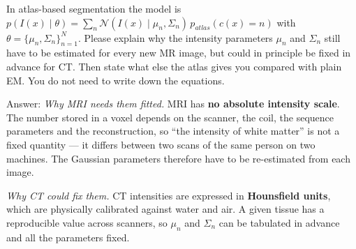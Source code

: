 \documentclass[11pt]{exam}
\newcommand{\answerspace}[1]{\ifprintanswers\else\vspace{#1}\fi}
\begin{document}
\begin{questions}

\question
In atlas-based segmentation the model is $p(I(x) \mid \theta) = \sum_n \mathcal{N}(I(x) \mid \mu_n,
\Sigma_n)\, p_{atlas}(c(x){=}n)$ with $\theta = \{\mu_n, \Sigma_n\}_{n=1}^N$. Please explain why the
intensity parameters $\mu_n$ and $\Sigma_n$ still have to be estimated for every new MR image, but
could in principle be fixed in advance for CT. Then state what else the atlas gives you compared
with plain EM. You do not need to write down the equations.

\begin{solution}
  Answer: \emph{Why MRI needs them fitted.} MRI has \textbf{no absolute intensity scale}. The number
  stored in a voxel depends on the scanner, the coil, the sequence parameters and the
  reconstruction, so ``the intensity of white matter'' is not a fixed quantity --- it differs
  between two scans of the same person on two machines. The Gaussian parameters therefore have to be
  re-estimated from each image.

  \emph{Why CT could fix them.} CT intensities are expressed in \textbf{Hounsfield units}, which are
  physically calibrated against water and air. A given tissue has a reproducible value across
  scanners, so $\mu_n$ and $\Sigma_n$ can be tabulated in advance and all the parameters fixed.


\end{solution}
\end{questions}
\end{document}
